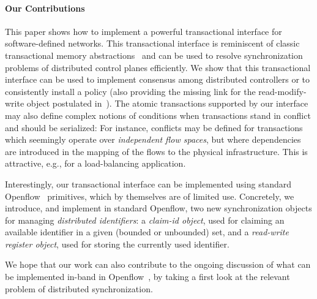 \documentclass[conference]{sigcomm-alternate}
\begin{document}
\paragraph{Our Contributions}
This paper shows how to implement a powerful transactional interface
for software-defined networks.
This transactional interface is reminiscent of
classic transactional memory abstractions~\cite{stm-st95,tm-book}
and
can be used to resolve
synchronization problems of distributed control planes efficiently.
We show that this transactional interface can be used to implement
consensus among distributed controllers or to consistently install a policy (also providing
the missing link for the read-modify-write object
postulated in~\cite{cpc}).
The atomic transactions supported by our interface
may also define complex notions
of conditions when transactions stand in conflict and should be serialized:
For instance, conflicts may be defined for transactions which seemingly
operate over \emph{independent flow spaces}, but where dependencies are introduced
in the mapping of the flows to the physical infrastructure. This is attractive,
e.g., for a load-balancing application.

Interestingly, our transactional interface can be implemented using standard Openflow~\cite{of-spec} primitives,
which by themselves are of limited use.
Concretely, we introduce, and implement in standard Openflow,
two new synchronization objects for managing \emph{distributed identifiers}:
a \emph{claim-id object}, used for claiming an available identifier in a given
(bounded or unbounded) set, and a \emph{read-write register object}, used for storing the
currently used identifier.

We hope that our work can also contribute to the ongoing discussion of what can be implemented
in-band in Openflow~\cite{compute,reclaim}, by taking a first look
at the relevant problem of distributed
synchronization.

\end{document}
